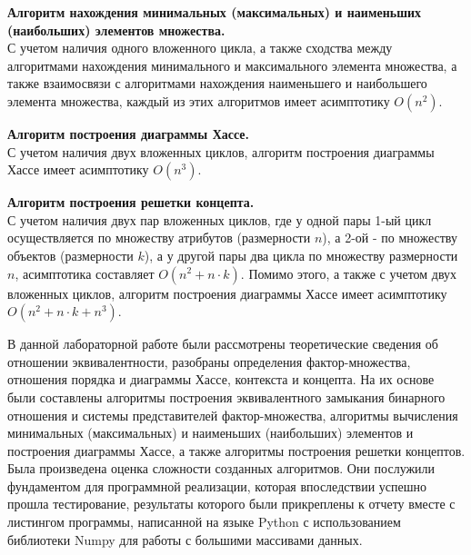 \documentclass[bachelor, och, labwork]{shiza}
\begin{document}
        \textbf{Алгоритм нахождения минимальных (максимальных) и наименьших (наибольших) элементов множества.}\\
            С учетом наличия одного вложенного цикла, а также сходства между алгоритмами нахождения минимального и
            максимального элемента множества, а также взаимосвязи с алгоритмами нахождения наименьшего и наибольшего
            элемента множества, каждый из этих алгоритмов имеет асимптотику $O(n^2)$.

        \textbf{Алгоритм построения диаграммы Хассе.}\\
            С учетом наличия двух вложенных циклов, алгоритм построения диаграммы Хассе имеет асимптотику $O(n^3)$.
        
        \textbf{Алгоритм построения решетки концепта.}\\
            С учетом наличия двух пар вложенных циклов, где у одной пары 1-ый цикл осуществляется по множеству атрибутов
            (размерности $n$), а 2-ой - по множеству объектов (размерности $k$), а у другой пары два цикла по множеству
            размерности $n$, асимптотика составляет $O(n^2 + n \cdot k)$. Помимо этого, а также с учетом двух вложенных
            циклов, алгоритм построения диаграммы Хассе имеет асимптотику $O(n^2 + n \cdot k + n^3)$.

\conclusion

    В данной лабораторной работе были рассмотрены теоретические сведения об отношении эквивалентности, разобраны
    определения фактор-множества, отношения порядка и диаграммы Хассе, контекста и концепта. На их основе были
    составлены алгоритмы построения эквивалентного замыкания бинарного отношения и системы представителей
    фактор-множества, алгоритмы вычисления минимальных (максимальных) и наименьших (наибольших) элементов и построения
    диаграммы Хассе, а также алгоритмы построения решетки концептов. Была произведена оценка сложности созданных
    алгоритмов. Они послужили фундаментом для программной реализации, которая впоследствии успешно прошла тестирование,
    результаты которого были прикреплены к отчету вместе с листингом программы, написанной на языке Python с
    использованием библиотеки Numpy для работы с большими массивами данных.
\end{document}
